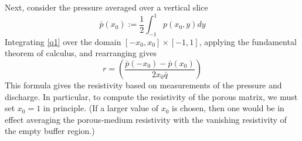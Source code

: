 \documentclass[preprint, superscriptaddress, notitlepage]{revtex4-1}
\newcommand{\qavg}{\bar{q}}
\newcommand{\pavg}{\bar{p}}
\begin{document}
Next, consider the pressure averaged over a vertical slice
\begin{equation}
\pavg(x_0) := \frac{1}{2} \int_{-1}^{1} p(x_0, y) dy
\end{equation}
Integrating \eqref{q1} over the domain $[-x_0, x_0] \times [-1,1]$, applying the fundamental theorem of calculus, and rearranging gives
\begin{equation}
r = \left( \frac{\pavg(-x_0) - \pavg(x_0)}{2 x_0 \qavg} \right)
\end{equation}
This formula gives the resistivity based on measurements of the pressure and discharge. In particular, to compute the resistivity of the porous matrix, we must set $x_0 =1$ in principle. (If a larger value of $x_0$ is chosen, then one would be in effect averaging the porous-medium resistivity with the vanishing resistivity of the empty buffer region.)




%
%
\end{document}
